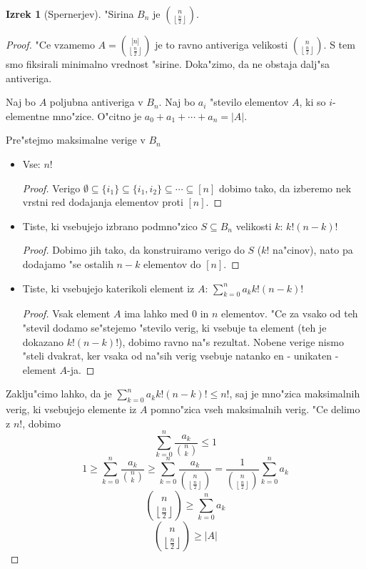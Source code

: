 \documentclass[a4paper,12pt]{article}
\theoremstyle{definition}
\newtheorem{theorem}[counter]{Izrek}
\theoremstyle{remark}
\begin{document}
\begin{theorem}[Spernerjev]
	"Sirina $B_n$ je $\binom{n}{\left\lfloor \frac{n}{2} \right\rfloor}$.
\end{theorem}
\begin{proof}
	"Ce vzamemo $A=\binom{\lbrack n \rbrack}{\left\lfloor \frac{n}{2} \right\rfloor}$ je to ravno antiveriga velikosti $\binom{n}{\left\lfloor \frac{n}{2} \right\rfloor}$. S tem smo fiksirali minimalno vrednost "sirine. Doka"zimo, da ne obstaja dalj"sa antiveriga.
	
	Naj bo $A$ poljubna antiveriga v $B_n$. Naj bo $a_i$ "stevilo elementov $A$, ki so $i$-elementne mno"zice. O"citno je $a_0 + a_1 + \cdots + a_n = |A|$.
	
	Pre"stejmo maksimalne verige v $B_n$
	\begin{itemize}
		\item Vse: $n!$
		\begin{proof}
			Verigo $\emptyset \subseteq \{i_1\} \subseteq \{i_1, i_2\} \subseteq \cdots \subseteq [n]$ dobimo tako, da izberemo nek vrstni red dodajanja elementov proti $[n]$.
		\end{proof}
		\item Tiste, ki vsebujejo izbrano podmno"zico $S \subseteq B_n$ velikosti $k$: $k!(n-k)!$
		\begin{proof}
			Dobimo jih tako, da konstruiramo verigo do $S$ ($k!$ na"cinov), nato pa dodajamo "se ostalih $n-k$ elementov do $[n]$.
		\end{proof}
		\item Tiste, ki vsebujejo katerikoli element iz $A$: $\sum_{k=0}^na_kk!(n-k)!$
		\begin{proof}
			Vsak element $A$ ima lahko med $0$ in $n$ elementov. "Ce za vsako od teh "stevil dodamo se"stejemo "stevilo verig, ki vsebuje ta element (teh je dokazano $k!(n-k)!$), dobimo ravno na"s rezultat. Nobene verige nismo "steli dvakrat, ker vsaka od na"sih verig vsebuje natanko en - unikaten - element $A$-ja.
		\end{proof}
	\end{itemize}
	Zaklju"cimo lahko, da je $\sum_{k=0}^na_kk!(n-k)! \leq n!$, saj je mno"zica maksimalnih verig, ki vsebujejo elemente iz $A$ pomno"zica vseh maksimalnih verig. "Ce delimo z $n!$, dobimo
	\[\sum_{k = 0}^n\frac{a_k}{\binom{n}{k}} \leq 1\]
	\[
		1 \geq
		\sum_{k = 0}^n\frac{a_k}{\binom{n}{k}} \geq
		\sum_{k = 0}^n\frac{a_k}{\binom{n}{\left\lfloor\frac{n}{2}\right\rfloor}} =
		\frac{1}{\binom{n}{\left\lfloor\frac{n}{2}\right\rfloor}}\sum_{k = 0}^na_k
	\]
	\[\binom{n}{\left\lfloor\frac{n}{2}\right\rfloor} \geq \sum_{k=0}^na_k\]
	\[\binom{n}{\left\lfloor\frac{n}{2}\right\rfloor} \geq |A|\]
\end{proof}
\end{document}
